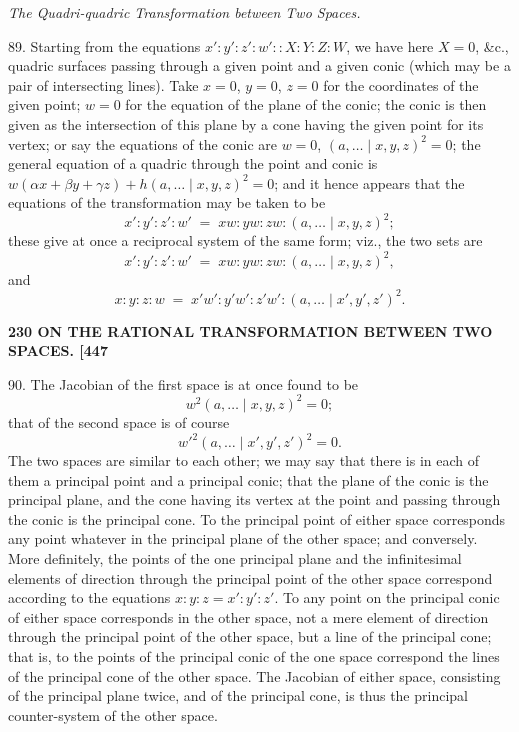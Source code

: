 \documentclass[11pt]{article}
\begin{document}
\medskip
\begin{center}\textit{The Quadri-quadric Transformation between Two Spaces.}\end{center}

89. Starting from the equations $x':y':z':w'::X:Y:Z:W$, we have here
$X=0$, \&c., quadric surfaces passing through a given point and a given conic (which
may be a pair of intersecting lines). Take $x=0$, $y=0$, $z=0$ for the coordinates of
the given point; $w=0$ for the equation of the plane of the conic; the conic is then
given as the intersection of this plane by a cone having the given point for its
vertex; or say the equations of the conic are $w=0$, $(a,\ldots\mid x,y,z)^2=0$; the general
equation of a quadric through the point and conic is $w(\alpha x + \beta y + \gamma z) + h(a,\ldots\mid x,y,z)^2=0$;
and it hence appears that the equations of the transformation may be taken to be
\[ x':y':z':w' \;=\; xw : yw : zw : (a,\ldots\mid x,y,z)^2; \]
these give at once a reciprocal system of the same form; viz., the two sets are
\[ x':y':z':w' \;=\; xw : yw : zw : (a,\ldots\mid x,y,z)^2, \]
and
\[ x:y:z:w \;=\; x'w' : y'w' : z'w' : (a,\ldots\mid x',y',z')^2. \]

\medskip
\noindent\textbf{230 \hfill ON THE RATIONAL TRANSFORMATION BETWEEN TWO SPACES. \hfill [447}

\medskip

90. The Jacobian of the first space is at once found to be
\[ w^2(a,\ldots\mid x,y,z)^2 = 0; \]
that of the second space is of course
\[ w'^2(a,\ldots\mid x',y',z')^2 = 0. \]
The two spaces are similar to each other; we may say that there is in each of them
a principal point and a principal conic; that the plane of the conic is the principal
plane, and the cone having its vertex at the point and passing through the conic is
the principal cone. To the principal point of either space corresponds any point
whatever in the principal plane of the other space; and conversely. More definitely, the
points of the one principal plane and the infinitesimal elements of direction through the
principal point of the other space correspond according to the equations $x:y:z=x':y':z'$.
To any point on the principal conic of either space corresponds in the other space, not
a mere element of direction through the principal point of the other space, but a
line of the principal cone; that is, to the points of the principal conic of the one
space correspond the lines of the principal cone of the other space. The Jacobian
of either space, consisting of the principal plane twice, and of the principal cone, is
thus the principal counter-system of the other space.
\end{document}
